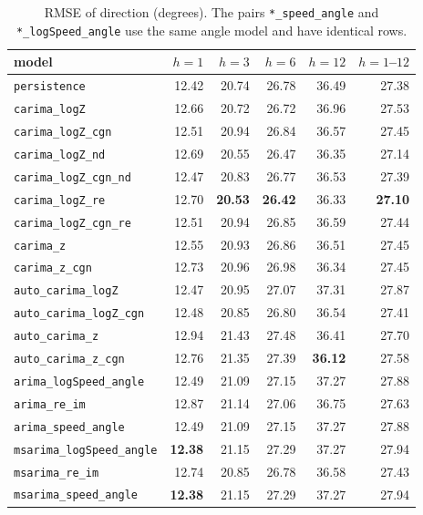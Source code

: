 \documentclass[11pt,a4paper]{article}
\newcommand{\code}[1]{\texttt{#1}}
\newcommand{\1}{\mathbf{1}}
\begin{document}
\begin{table}[H]
  \centering
  \caption{RMSE of direction (degrees). The pairs \code{*\_speed\_angle} and
    \code{*\_logSpeed\_angle} use the same angle model and have identical rows.}\label{tab:rmse-angle}
  \begin{tabular}{lrrrrr}
    \toprule
    model & $h=1$ & $h=3$ & $h=6$ & $h=12$ & $h=1$--$12$ \\
    \midrule
\texttt{persistence} & 12.42 & 20.74 & 26.78 & 36.49 & 27.38 \\ \midrule
\texttt{carima\_logZ} & 12.66 & 20.72 & 26.72 & 36.96 & 27.53 \\
\texttt{carima\_logZ\_cgn} & 12.51 & 20.94 & 26.84 & 36.57 & 27.45 \\
\texttt{carima\_logZ\_nd} & 12.69 & 20.55 & 26.47 & 36.35 & 27.14 \\
\texttt{carima\_logZ\_cgn\_nd} & 12.47 & 20.83 & 26.77 & 36.53 & 27.39 \\
\texttt{carima\_logZ\_re} & 12.70 & \textbf{20.53} & \textbf{26.42} & 36.33 & \textbf{27.10} \\
\texttt{carima\_logZ\_cgn\_re} & 12.51 & 20.94 & 26.85 & 36.59 & 27.44 \\
\texttt{carima\_z} & 12.55 & 20.93 & 26.86 & 36.51 & 27.45 \\
\texttt{carima\_z\_cgn} & 12.73 & 20.96 & 26.98 & 36.34 & 27.45 \\ \midrule
\texttt{auto\_carima\_logZ} & 12.47 & 20.95 & 27.07 & 37.31 & 27.87 \\
\texttt{auto\_carima\_logZ\_cgn} & 12.48 & 20.85 & 26.80 & 36.54 & 27.41 \\
\texttt{auto\_carima\_z} & 12.94 & 21.43 & 27.48 & 36.41 & 27.70 \\
\texttt{auto\_carima\_z\_cgn} & 12.76 & 21.35 & 27.39 & \textbf{36.12} & 27.58 \\ \midrule
\texttt{arima\_logSpeed\_angle} & 12.49 & 21.09 & 27.15 & 37.27 & 27.88 \\
\texttt{arima\_re\_im} & 12.87 & 21.14 & 27.06 & 36.75 & 27.63 \\
\texttt{arima\_speed\_angle} & 12.49 & 21.09 & 27.15 & 37.27 & 27.88 \\
\texttt{msarima\_logSpeed\_angle} & \textbf{12.38} & 21.15 & 27.29 & 37.27 & 27.94 \\
\texttt{msarima\_re\_im} & 12.74 & 20.85 & 26.78 & 36.58 & 27.43 \\
\texttt{msarima\_speed\_angle} & \textbf{12.38} & 21.15 & 27.29 & 37.27 & 27.94 \\
    \bottomrule
  \end{tabular}
\end{table}
\end{document}
